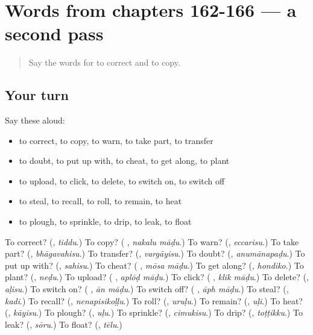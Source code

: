 \section[(dialogue)]{Words from chapters 162-166 — a second pass}

\label{lesson:KA-R166-second-pass-words-from-chapters-162-166}



\begin{quote}
Say the words for to correct and to copy.
\end{quote}

\subsection*{Your turn}
Say these aloud:

\begin{itemize}
\raggedright
  \item to correct, to copy, to warn, to take part, to transfer
  \item to doubt, to put up with, to cheat, to get along, to plant
  \item to upload, to click, to delete, to switch on, to switch off
  \item to steal, to recall, to roll, to remain, to heat
  \item to plough, to sprinkle, to drip, to leak, to float
\end{itemize}

\begin{tcolorbox}[breakable,colback=teal!4,colframe=teal!35!black,title={Before you move on}]
To correct? (\textbf{}, \emph{tiddu}.) To copy? (\textbf{ }, \emph{nakalu māḍu}.) To warn? (\textbf{}, \emph{eccarisu}.) To take part? (\textbf{}, \emph{bhāgavahisu}.) To transfer? (\textbf{}, \emph{vargāyisu}.) To doubt? (\textbf{}, \emph{anumānapaḍu}.) To put up with? (\textbf{}, \emph{sahisu}.) To cheat? (\textbf{ }, \emph{mōsa māḍu}.) To get along? (\textbf{}, \emph{hondiko}.) To plant? (\textbf{}, \emph{neḍu}.) To upload? (\textbf{ }, \emph{aplōḍ māḍu}.) To click? (\textbf{ }, \emph{klik māḍu}.) To delete? (\textbf{}, \emph{aḷisu}.) To switch on? (\textbf{ }, \emph{ān māḍu}.) To switch off? (\textbf{ }, \emph{āph māḍu}.) To steal? (\textbf{}, \emph{kadi}.) To recall? (\textbf{}, \emph{nenapisikoḷḷu}.) To roll? (\textbf{}, \emph{uruḷu}.) To remain? (\textbf{}, \emph{uḷi}.) To heat? (\textbf{}, \emph{kāyisu}.) To plough? (\textbf{}, \emph{uḷu}.) To sprinkle? (\textbf{}, \emph{cimukisu}.) To drip? (\textbf{}, \emph{toṭṭikku}.) To leak? (\textbf{}, \emph{sōru}.) To float? (\textbf{}, \emph{tēlu}.)
\end{tcolorbox}
